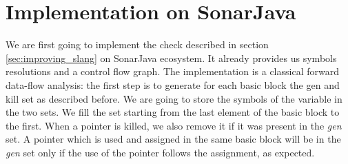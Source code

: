 \section{Implementation on SonarJava}
\label{sec:implementation_java}

We are first going to implement the check described in section \ref{sec:improving_slang} on SonarJava ecosystem.
It already provides us symbols resolutions and a control flow graph.
The implementation is a classical forward data-flow analysis: the first step is to generate for each basic block the gen and kill set as described before. 
We are going to store the symbols of the variable in the two sets. 
We fill the set starting from the last element of the basic block to the first.
When a pointer is killed, we also remove it if it was present in the \emph{gen} set.
A pointer which is used and assigned in the same basic block will be in the \emph{gen} set only if the use of the pointer follows the assignment, as expected.

 

